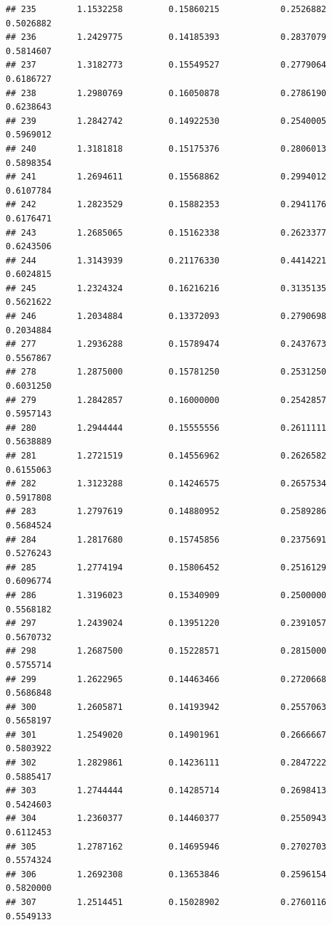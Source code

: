 \documentclass[]{article}
\begin{document}
\begin{verbatim}
## 235        1.1532258         0.15860215            0.2526882        0.5026882
## 236        1.2429775         0.14185393            0.2837079        0.5814607
## 237        1.3182773         0.15549527            0.2779064        0.6186727
## 238        1.2980769         0.16050878            0.2786190        0.6238643
## 239        1.2842742         0.14922530            0.2540005        0.5969012
## 240        1.3181818         0.15175376            0.2806013        0.5898354
## 241        1.2694611         0.15568862            0.2994012        0.6107784
## 242        1.2823529         0.15882353            0.2941176        0.6176471
## 243        1.2685065         0.15162338            0.2623377        0.6243506
## 244        1.3143939         0.21176330            0.4414221        0.6024815
## 245        1.2324324         0.16216216            0.3135135        0.5621622
## 246        1.2034884         0.13372093            0.2790698        0.2034884
## 277        1.2936288         0.15789474            0.2437673        0.5567867
## 278        1.2875000         0.15781250            0.2531250        0.6031250
## 279        1.2842857         0.16000000            0.2542857        0.5957143
## 280        1.2944444         0.15555556            0.2611111        0.5638889
## 281        1.2721519         0.14556962            0.2626582        0.6155063
## 282        1.3123288         0.14246575            0.2657534        0.5917808
## 283        1.2797619         0.14880952            0.2589286        0.5684524
## 284        1.2817680         0.15745856            0.2375691        0.5276243
## 285        1.2774194         0.15806452            0.2516129        0.6096774
## 286        1.3196023         0.15340909            0.2500000        0.5568182
## 297        1.2439024         0.13951220            0.2391057        0.5670732
## 298        1.2687500         0.15228571            0.2815000        0.5755714
## 299        1.2622965         0.14463466            0.2720668        0.5686848
## 300        1.2605871         0.14193942            0.2557063        0.5658197
## 301        1.2549020         0.14901961            0.2666667        0.5803922
## 302        1.2829861         0.14236111            0.2847222        0.5885417
## 303        1.2744444         0.14285714            0.2698413        0.5424603
## 304        1.2360377         0.14460377            0.2550943        0.6112453
## 305        1.2787162         0.14695946            0.2702703        0.5574324
## 306        1.2692308         0.13653846            0.2596154        0.5820000
## 307        1.2514451         0.15028902            0.2760116        0.5549133

\end{verbatim}
\end{document}
